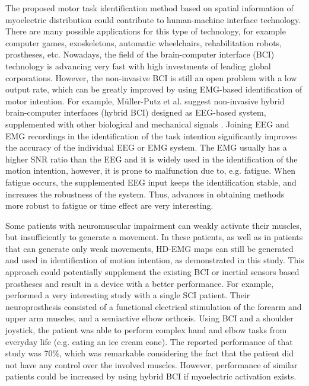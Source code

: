 The proposed motor task identification method based on spatial information of myoelectric distribution could contribute to human-machine interface technology. There are many possible applications for this type of technology, for example computer games, exoskeletons, automatic wheelchairs, rehabilitation robots, prostheses, etc. Nowadays, the field of the brain-computer interface (BCI) technology is advancing very fast with high investments of leading global corporations. However, the non-invasive BCI is still an open problem with a low output rate, which can be greatly improved by using EMG-based identification of motor intention. For example, Müller-Putz et al. suggest non-invasive hybrid brain-computer interfaces (hybrid BCI) designed as EEG-based system, supplemented with other biological and mechanical signals  \citep{Muller-Putz2015}. Joining EEG and EMG recordings in the identification of the task intention significantly improves the accuracy of the individual EEG or EMG system. The EMG usually has a higher SNR ratio than the EEG and it is widely used in the identification of the motion intention, however, it is prone to malfunction due to, e.g. fatigue. When fatigue occurs, the supplemented EEG input keeps the identification stable, and increases the robustness of the system. Thus, advances in obtaining methods more robust to fatigue or time effect are very interesting.

Some patients with neuromuscular impairment can weakly activate their muscles, but insufficiently to generate a movement. In these patients, as well as in patients that can generate only weak movements, HD-EMG maps can still be generated and used in identification of motion intention, as demonstrated in this study. This approach could potentially supplement the existing BCI or inertial sensors based prostheses and result in a device with a better performance. For example, \citet{Rohm2013} performed a very interesting study with a single SCI patient. Their neuroprosthesis consisted of a functional electrical stimulation of the forearm and upper arm muscles, and a semiactive elbow orthosis. Using BCI and a shoulder joystick, the patient was able to perform complex hand and elbow tasks from everyday life (e.g. eating an ice cream cone). The reported performance of that study was 70\%, which was remarkable considering the fact that the patient did not have any control over the involved muscles. However, performance of similar patients could be increased by using hybrid BCI if myoelectric activation exists.

